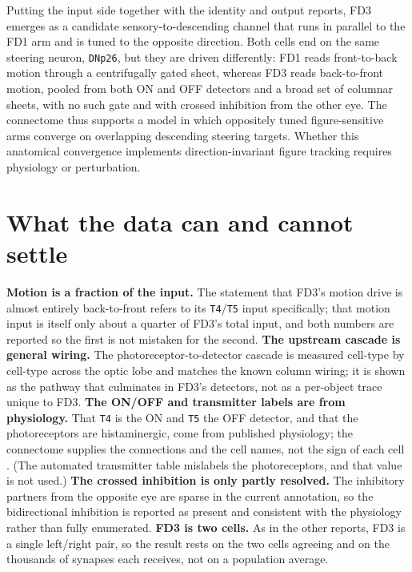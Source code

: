 \documentclass[11pt]{article}
\newcommand{\ttt}[1]{\texttt{#1}}
\begin{document}
Putting the input side together with the identity and output reports, FD3 emerges as a candidate sensory-to-descending channel that runs in parallel to the FD1 arm and is tuned to the opposite direction. Both cells end on the same steering neuron, \ttt{DNp26}, but they are driven differently: FD1 reads front-to-back motion through a centrifugally gated sheet, whereas FD3 reads back-to-front motion, pooled from both ON and OFF detectors and a broad set of columnar sheets, with no such gate and with crossed inhibition from the other eye. The connectome thus supports a model in which oppositely tuned figure-sensitive arms converge on overlapping descending steering targets. Whether this anatomical convergence implements direction-invariant figure tracking requires physiology or perturbation.

\section{What the data can and cannot settle}

\textbf{Motion is a fraction of the input.} The statement that FD3's motion drive is almost entirely back-to-front refers to its \ttt{T4}/\ttt{T5} input specifically; that motion input is itself only about a quarter of FD3's total input, and both numbers are reported so the first is not mistaken for the second. \textbf{The upstream cascade is general wiring.} The photoreceptor-to-detector cascade is measured cell-type by cell-type across the optic lobe and matches the known column wiring; it is shown as the pathway that culminates in FD3's detectors, not as a per-object trace unique to FD3. \textbf{The ON/OFF and transmitter labels are from physiology.} That \ttt{T4} is the ON and \ttt{T5} the OFF detector, and that the photoreceptors are histaminergic, come from published physiology; the connectome supplies the connections and the cell names, not the sign of each cell \cite{maisak2013,hardie1989}. (The automated transmitter table mislabels the photoreceptors, and that value is not used.) \textbf{The crossed inhibition is only partly resolved.} The inhibitory partners from the opposite eye are sparse in the current annotation, so the bidirectional inhibition is reported as present and consistent with the physiology rather than fully enumerated. \textbf{FD3 is two cells.} As in the other reports, FD3 is a single left/right pair, so the result rests on the two cells agreeing and on the thousands of synapses each receives, not on a population average.
\end{document}
